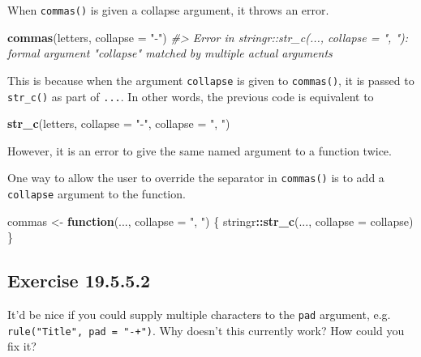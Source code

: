 \documentclass[]{book}
\newenvironment{Shaded}{\begin{snugshade}}{\end{snugshade}}
\newcommand{\CommentTok}[1]{\textcolor[rgb]{0.56,0.35,0.01}{\textit{#1}}}
\newcommand{\ControlFlowTok}[1]{\textcolor[rgb]{0.13,0.29,0.53}{\textbf{#1}}}
\newcommand{\DataTypeTok}[1]{\textcolor[rgb]{0.13,0.29,0.53}{#1}}
\newcommand{\KeywordTok}[1]{\textcolor[rgb]{0.13,0.29,0.53}{\textbf{#1}}}
\newcommand{\NormalTok}[1]{#1}
\newcommand{\OperatorTok}[1]{\textcolor[rgb]{0.81,0.36,0.00}{\textbf{#1}}}
\newcommand{\StringTok}[1]{\textcolor[rgb]{0.31,0.60,0.02}{#1}}
\theoremstyle{plain}
\theoremstyle{remark}
\begin{document}
When \texttt{commas()} is given a collapse argument, it throws an error.

\begin{Shaded}
\begin{Highlighting}[]
\KeywordTok{commas}\NormalTok{(letters, }\DataTypeTok{collapse =} \StringTok{"-"}\NormalTok{)}
\CommentTok{#> Error in stringr::str_c(..., collapse = ", "): formal argument "collapse" matched by multiple actual arguments}
\end{Highlighting}
\end{Shaded}

This is because when the argument \texttt{collapse} is given to \texttt{commas()}, it
is passed to \texttt{str\_c()} as part of \texttt{...}.
In other words, the previous code is equivalent to

\begin{Shaded}
\begin{Highlighting}[]
\KeywordTok{str_c}\NormalTok{(letters, }\DataTypeTok{collapse =} \StringTok{"-"}\NormalTok{, }\DataTypeTok{collapse =} \StringTok{", "}\NormalTok{)}
\end{Highlighting}
\end{Shaded}

However, it is an error to give the same named argument to a function twice.

One way to allow the user to override the separator in \texttt{commas()} is to add a \texttt{collapse}
argument to the function.

\begin{Shaded}
\begin{Highlighting}[]
\NormalTok{commas <-}\StringTok{ }\ControlFlowTok{function}\NormalTok{(..., }\DataTypeTok{collapse =} \StringTok{", "}\NormalTok{) \{}
\NormalTok{  stringr}\OperatorTok{::}\KeywordTok{str_c}\NormalTok{(..., }\DataTypeTok{collapse =}\NormalTok{ collapse)}
\NormalTok{\}}
\end{Highlighting}
\end{Shaded}

\hypertarget{exercise-19.5.5.2}{%
\subsection*{\texorpdfstring{Exercise {19.5.5.2}}{Exercise 19.5.5.2}}\label{exercise-19.5.5.2}}

It'd be nice if you could supply multiple characters to the \texttt{pad} argument, e.g. \texttt{rule("Title",\ pad\ =\ "-+")}.
Why doesn't this currently work? How could you fix it?
\end{document}
